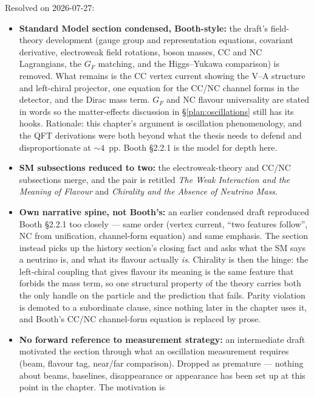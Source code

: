 \documentclass[11pt]{article}
\begin{document}
Resolved on 2026-07-27:
\begin{itemize}
    \item[$\checkmark$] \textbf{Standard Model section condensed, Booth-style:} the draft's
    field-theory development (gauge group and representation equations, covariant derivative,
    electroweak field rotations, boson masses, CC and NC Lagrangians, the $G_{F}$ matching, and
    the Higgs--Yukawa comparison) is removed. What remains is the CC vertex current showing the
    V--A structure and left-chiral projector, one equation for the CC/NC channel forms in the
    detector, and the Dirac mass term. $G_{F}$ and NC flavour universality are stated in words
    so the matter-effects discussion in \S\ref{plan:oscillations} still has its hooks.
    Rationale: this chapter's argument is oscillation phenomenology, and the QFT derivations
    were both beyond what the thesis needs to defend and disproportionate at $\sim 4$~pp. Booth
    \S2.2.1 is the model for depth here.
    \item[$\checkmark$] \textbf{SM subsections reduced to two:} the electroweak-theory and
    CC/NC subsections merge, and the pair is retitled
    \emph{The Weak Interaction and the Meaning of Flavour} and
    \emph{Chirality and the Absence of Neutrino Mass}.
    \item[$\checkmark$] \textbf{Own narrative spine, not Booth's:} an earlier condensed draft
    reproduced Booth \S2.2.1 too closely --- same order (vertex current, ``two features follow'',
    NC from unification, channel-form equation) and same emphasis. The section instead picks up
    the history section's closing fact and asks what the SM says a neutrino is, and what its
    flavour actually \emph{is}. Chirality is then the hinge: the left-chiral coupling that gives
    flavour its meaning is the same feature that forbids the mass term, so one structural
    property of the theory carries both the only handle on the particle and the prediction that
    fails. Parity violation is demoted to a subordinate clause, since nothing later in the
    chapter uses it, and Booth's CC/NC channel-form equation is replaced by prose.
    \item[$\checkmark$] \textbf{No forward reference to measurement strategy:} an intermediate
    draft motivated the section through what an oscillation measurement requires (beam, flavour
    tag, near/far comparison). Dropped as premature --- nothing about beams, baselines,
    disappearance or appearance has been set up at this point in the chapter. The motivation is

\end{itemize}
\end{document}

